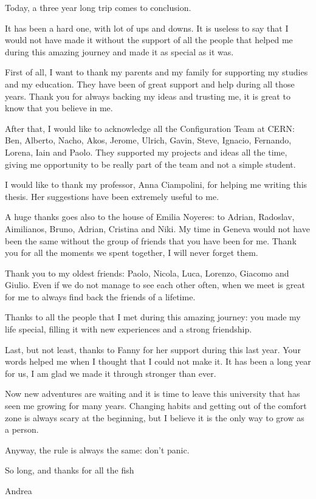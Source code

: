 
\thispagestyle{empty}

Today, a three year long trip comes to conclusion.

It has been a hard one, with lot of ups and downs. It is useless to say
that I would not have made it without the support of all the people that
helped me during this amazing journey and made it as special as it was.

First of all, I want to thank my parents and my family for supporting my
studies and my education. They have been of great support and help during
all those years. Thank you for always backing my ideas and trusting me, it
is great to know that you believe in me.

After that, I would like to acknowledge all the Configuration Team at
CERN: Ben, Alberto, Nacho, Akos, Jerome, Ulrich, Gavin, Steve, Ignacio,
Fernando, Lorena, Iain and Paolo. They supported my projects and ideas all
the time, giving me opportunity to be really part of the team and not
a simple student.

I would like to thank my professor, Anna Ciampolini, for helping me
writing this thesis. Her suggestions have been extremely useful to me.

A huge thanks goes also to the house of Emilia Noyeres: to Adrian,
Radoslav, Aimilianos, Bruno, Adrian, Cristina and Niki. My time in Geneva
would not have been the same without the group of friends that you have
been for me. Thank you for all the moments we spent together, I will
never forget them.

Thank you to my oldest friends: Paolo, Nicola, Luca, Lorenzo, Giacomo and
Giulio. Even if we do not manage to see each other often, when we meet is
great for me to always find back the friends of a lifetime.

Thanks to all the people that I met during this amazing journey: you made
my life special, filling it with new experiences and a strong friendship.

Last, but not least, thanks to Fanny for her support during this last
year. Your words helped me when I thought that I could not make it. It has
been a long year for us, I am glad we made it through stronger than
ever.

Now new adventures are waiting and it is time to leave this university
that has seen me growing for many years. Changing habits and getting out
of the comfort zone is always scary at the beginning, but I believe it is
the only way to grow as a person. 

Anyway, the rule is always the same: don't panic.\\

\begin{center} So long, and thanks for all the fish \\ \end{center}

\begin{flushright} Andrea \end{flushright}
